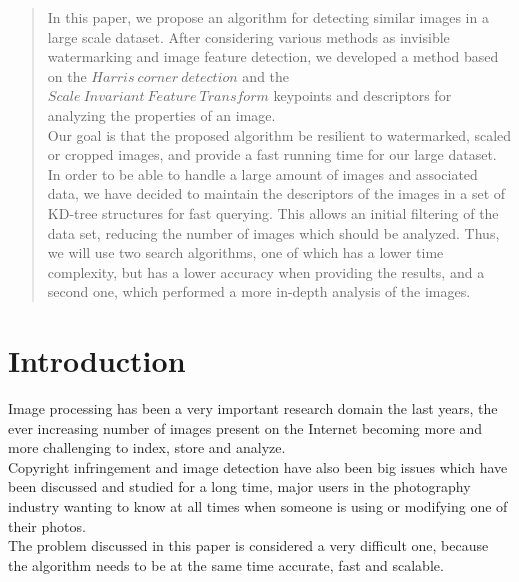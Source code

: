 \documentclass[conference]{IEEEtran}
\begin{document}
\begin{abstract}
In this paper, we propose an algorithm for detecting similar images in a large scale dataset. After considering various methods as invisible watermarking and image feature detection, we developed a method based on the $Harris\ corner\ detection$ and the $Scale\ Invariant\ Feature\ Transform$ keypoints and descriptors for analyzing the properties of an image.\\
Our goal is that the proposed algorithm be resilient to watermarked, scaled or cropped images, and provide a fast running time for our large dataset.\\
In order to be able to handle a large amount of images and associated data, we have decided to maintain the descriptors of the images in a set of KD-tree structures for fast querying. This allows an initial filtering of the data set, reducing the number of images which should be analyzed. Thus, we will use two search algorithms, one of which has a lower time complexity, but has a lower accuracy when providing the results, and a second one, which performed a more in-depth analysis of the images.\\
\end{abstract}





%
\IEEEpeerreviewmaketitle



\section{Introduction}
Image processing has been a very important research domain the last years, the ever increasing number of images present on the Internet becoming more and more challenging to index, store and analyze.\\
Copyright infringement and image detection have also been big issues which have been discussed and studied for a long time, major users in the photography industry wanting to know at all times when someone is using or modifying one of their photos.\\
The problem discussed in this paper is considered a very difficult one, because the algorithm needs to be at the same time accurate, fast and scalable. \\
\end{document}
